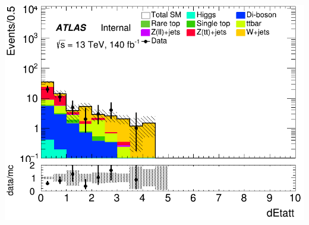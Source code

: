 \documentclass[usenames,dvipsnames]{beamer}
\begin{document}
\begin{frame}
    \begin{minipage}{0.32\textwidth}
        \centering
        \includegraphics[width=\textwidth]{graphics/HHH_met/HHH_met_dEtatt.png}
    \end{minipage}
    
    \vspace{0.5cm} %
\end{frame}
\end{document}
